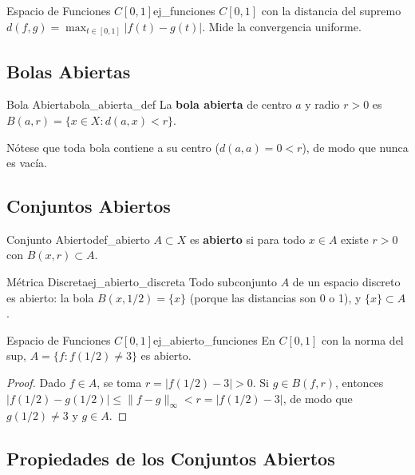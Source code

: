 \documentclass[11pt, a4paper]{article}
\begin{document}
\begin{ejemplo}{Espacio de Funciones $C[0,1]$}{ej_funciones}
$C[0,1]$ con la distancia del supremo $d(f,g) = \max_{t \in [0,1]} |f(t) - g(t)|$. Mide la
convergencia uniforme.
\end{ejemplo}

\subsection{Bolas Abiertas}

\begin{definicion}{Bola Abierta}{bola_abierta_def}
La \textbf{bola abierta} de centro $a$ y radio $r > 0$ es $B(a, r) = \{x \in X : d(a, x) < r\}$.
\end{definicion}

Nótese que toda bola contiene a su centro ($d(a,a) = 0 < r$), de modo que nunca es vacía.

\subsection{Conjuntos Abiertos}

\begin{definicion}{Conjunto Abierto}{def_abierto}
$A \subset X$ es \textbf{abierto} si para todo $x \in A$ existe $r > 0$ con $B(x, r) \subset A$.
\end{definicion}

\begin{ejemplo}{Métrica Discreta}{ej_abierto_discreta}
Todo subconjunto $A$ de un espacio discreto es abierto: la bola $B(x, 1/2) = \{x\}$ (porque las
distancias son 0 o 1), y $\{x\} \subset A$.
\end{ejemplo}

\begin{ejemplo}{Espacio de Funciones $C[0,1]$}{ej_abierto_funciones}
En $C[0,1]$ con la norma del sup, $A = \{f : f(1/2) \ne 3\}$ es abierto.

\begin{proof}
Dado $f \in A$, se toma $r = |f(1/2) - 3| > 0$. Si $g \in B(f, r)$, entonces
$|f(1/2) - g(1/2)| \le \|f - g\|_\infty < r = |f(1/2) - 3|$, de modo que $g(1/2) \ne 3$ y $g \in A$.
\end{proof}
\end{ejemplo}

\subsection{Propiedades de los Conjuntos Abiertos}
\end{document}
